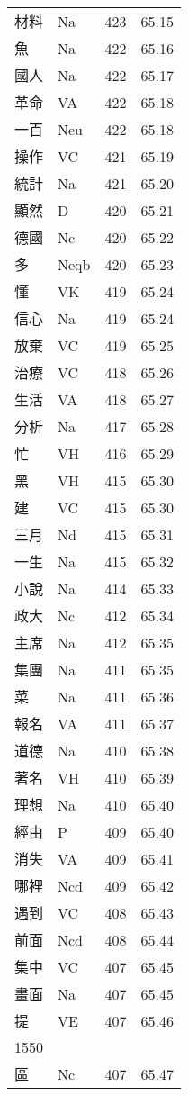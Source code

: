 \documentclass[twocolumn]{book}
\begin{document}
\begin{supertabular}{llrr}
材料 & Na & 423 &  65.15\\
魚 & Na & 422 &  65.16\\
國人 & Na & 422 &  65.17\\
革命 & VA & 422 &  65.18\\
一百 & Neu & 422 &  65.18\\
操作 & VC & 421 &  65.19\\
統計 & Na & 421 &  65.20\\
顯然 & D & 420 &  65.21\\
德國 & Nc & 420 &  65.22\\
多 & Neqb & 420 &  65.23\\
懂 & VK & 419 &  65.24\\
信心 & Na & 419 &  65.24\\
放棄 & VC & 419 &  65.25\\
治療 & VC & 418 &  65.26\\
生活 & VA & 418 &  65.27\\
分析 & Na & 417 &  65.28\\
忙 & VH & 416 &  65.29\\
黑 & VH & 415 &  65.30\\
建 & VC & 415 &  65.30\\
三月 & Nd & 415 &  65.31\\
一生 & Na & 415 &  65.32\\
小說 & Na & 414 &  65.33\\
政大 & Nc & 412 &  65.34\\
主席 & Na & 412 &  65.35\\
集團 & Na & 411 &  65.35\\
菜 & Na & 411 &  65.36\\
報名 & VA & 411 &  65.37\\
道德 & Na & 410 &  65.38\\
著名 & VH & 410 &  65.39\\
理想 & Na & 410 &  65.40\\
經由 & P & 409 &  65.40\\
消失 & VA & 409 &  65.41\\
哪裡 & Ncd & 409 &  65.42\\
遇到 & VC & 408 &  65.43\\
前面 & Ncd & 408 &  65.44\\
集中 & VC & 407 &  65.45\\
畫面 & Na & 407 &  65.45\\
提 & VE & 407 &  65.46\\
1550\\
區 & Nc & 407 &  65.47\\

\end{supertabular}
\end{document}
